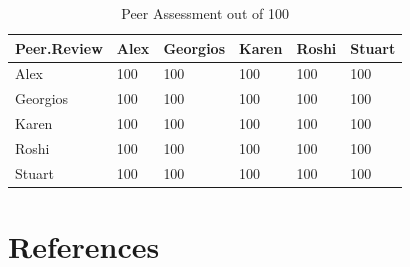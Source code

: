 \documentclass[10pt]{article}\usepackage[]{graphicx}\usepackage[]{color}
\begin{document}
\begin{table}[ht]
\centering
\caption{Peer Assessment out of 100} 
\label{tab:two}
\begin{tabular}{llllll}
  \hline
Peer.Review & Alex & Georgios & Karen & Roshi & Stuart \\ 
  \hline
Alex & 100 & 100 & 100 & 100 & 100 \\ 
  Georgios & 100 & 100 & 100 & 100 & 100 \\ 
  Karen & 100 & 100 & 100 & 100 & 100 \\ 
  Roshi & 100 & 100 & 100 & 100 & 100 \\ 
  Stuart & 100 & 100 & 100 & 100 & 100 \\ 
   \hline
\end{tabular}
\end{table}



\pagebreak
\section*{References}\label{pubs}
\printbibliography[heading=none]
\end{document}
